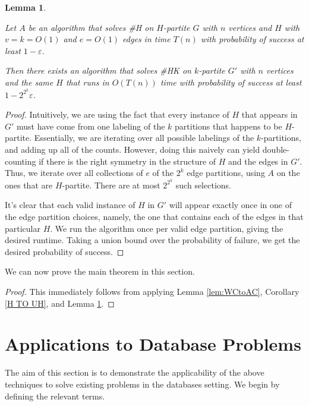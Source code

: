 \documentclass[11pt,letterpaper,pdftex]{article}
\newtheorem{lemma}[theorem]{Lemma}
\begin{document}
\begin{lemma}\label{lem: HK to H}

Let $A$ be an algorithm that solves \#H on $H$-partite $G$ with $n$ vertices and $H$ with $v = k = O(1)$ and $e = O(1)$ edges in time $T(n)$ with probability of success at least $1-\varepsilon$.

Then there exists an algorithm that solves \#HK on $k$-partite $G'$ with $n$ vertices and the same $H$ that runs in $O(T(n))$ time with probability of success at least $1 - 2^{2^k}\varepsilon$.

\end{lemma}
\begin{proof}
Intuitively, we are using the fact that every instance of $H$ that appears in $G'$ must have come from one labeling of the $k$ partitions that happens to be $H$-partite. Essentially, we are iterating over all possible labelings of the $k$-partitions, and adding up all of the counts. However, doing this naively can yield double-counting if there is the right symmetry in the structure of $H$ and the edges in $G'$. Thus, we iterate over all collections of $e$ of the $2^k$ edge partitions, using $A$ on the ones that are $H$-partite. There are at most $2^ {2 ^ k} $ such selections.



It's clear that each valid instance of $H$ in $G'$ will appear exactly once in one of the edge partition choices, namely, the one that contains each of the edges in that particular $H$. We run the algorithm once per valid edge partition, giving the desired runtime. Taking a union bound over the probability of failure, we get the desired probability of success.





\end{proof}


We can now prove the main theorem in this section.

\WCtoACcounting*

\begin{proof}
This immediately follows from applying Lemma \ref{lem:WCtoAC}, Corollary \ref{H TO UH}, and Lemma \ref{lem: HK to H}.
\end{proof}





 
\section{Applications to Database Problems}
\label{sec:database}
The aim of this section is to demonstrate the applicability of the above techniques to solve existing problems in the databases setting. We begin by defining the relevant terms.
\end{document}

